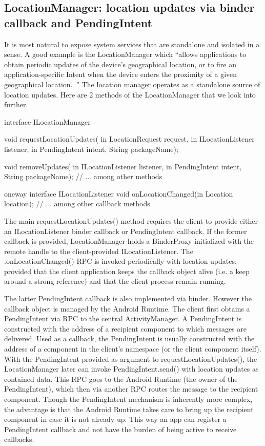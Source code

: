 \documentclass[prodmode]{acmlarge}
\begin{document}
\subsection{LocationManager: location updates via binder callback and PendingIntent}
It is most natural to expose system services that are standalone and isolated in a sense. A good example is the LocationManager which ``allows applications to obtain periodic updates of the device's geographical location, or to fire an application-specific Intent when the device enters the proximity of a given geographical location.~\cite{LocationManagerDocs}'' The location manager operates as a standalone source of location updates. Here are 2 methods of the LocationManager that we look into further.

\begin{snippet}
interface ILocationManager {
  void requestLocationUpdates(
      in LocationRequest request,
      in ILocationListener listener,
      in PendingIntent intent,
      String packageName);

  void removeUpdates(
      in ILocationListener listener,
      in PendingIntent intent,
      String packageName);
  // ... among other methods
}
\end{snippet}

\begin{snippet}
oneway interface ILocationListener {
    void onLocationChanged(in Location location);
    // ... among other callback methods
}
\end{snippet}

The main requestLocationUpdates() method requires the client to provide either an ILocationListener binder callback or PendingIntent callback. If the former callback is provided, LocationManager holds a BinderProxy initialized with the remote handle to the client-provided ILocationListener. The .onLocationChanged() RPC is invoked periodically with location updates, provided that the client application keeps the callback object alive (i.e. a keep around a strong reference) and that the client process remain running.

The latter PendingIntent callback is also implemented via binder. However the callback object is managed by the Android Runtime. The client first obtains a PendingIntent via RPC to the central ActivityManager. A PendingIntent is constructed with the address of a recipient component to which messages are delivered. Used as a callback, the PendingIntent is usually constructed with the address of a component in the client's namespace (or the client component itself). With the PendingIntent provided as argument to requestLocationUpdates(), the LocationManager later can invoke PendingIntent.send() with location updates as contained data. This RPC goes to the Android Runtime (the owner of the PendingIntent), which then via another RPC routes the message to the recipient component. Though the PendingIntent mechanism is inherently more complex, the advantage is that the Android Runtime takes care to bring up the recipient component in case it is not already up. This way an app can register a PendingIntent callback and not have the burden of being active to receive callbacks.
\end{document}
